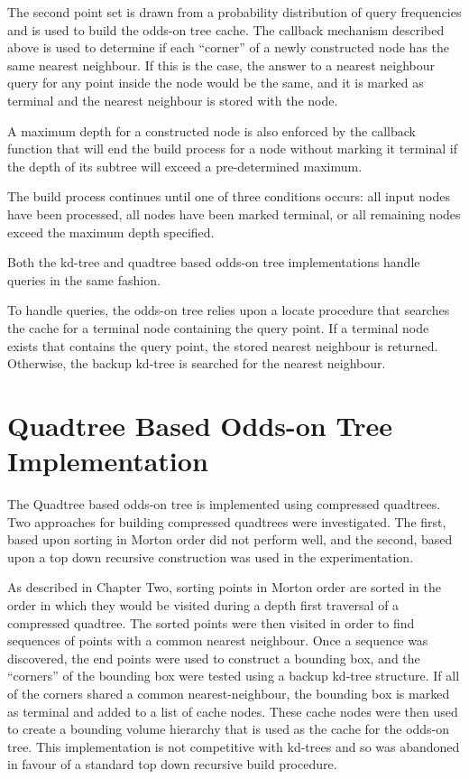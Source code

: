 \documentclass[mcs]{scsthesis}
\begin{document}
The second point set is drawn from a probability distribution of query
frequencies and is used to build the odds-on tree cache. The callback mechanism
described above is used to determine if each ``corner'' of a newly constructed
node has the same nearest neighbour. If this is the case, the answer to a
nearest neighbour query for any point inside the node would be the same, and it
is marked as terminal and the nearest neighbour is stored with the node.

A maximum depth for a constructed node is also enforced by the callback
function that will end the build process for a node without marking it
terminal if the depth of its subtree will exceed a pre-determined maximum.

The build process continues until one of three conditions occurs: all input nodes
have been processed, all nodes have been marked terminal, or all remaining nodes
exceed the maximum depth specified.

Both the kd-tree and quadtree based odds-on tree implementations handle queries
in the same fashion.

To handle queries, the odds-on tree relies upon a locate procedure that searches
the cache for a terminal node containing the query point. If a terminal node
exists that contains the query point, the stored nearest neighbour is returned.
Otherwise, the backup kd-tree is searched for the nearest neighbour.

\section{Quadtree Based Odds-on Tree Implementation}

The Quadtree based odds-on tree is implemented using compressed quadtrees. Two
approaches for building compressed quadtrees were investigated. The first,
based upon sorting in Morton order did not perform well, and the second, based
upon a top down recursive construction was used in the experimentation.

As described in Chapter Two, sorting points in Morton order are sorted in the
order in which they would be visited during a depth first traversal of a
compressed quadtree. The sorted points were then visited in order to find
sequences of points with a common nearest neighbour. Once a sequence was
discovered, the end points were used to construct a bounding box, and the
``corners'' of the bounding box were tested using a backup kd-tree structure.
If all of the corners shared a common nearest-neighbour, the bounding box is
marked as terminal and added to a list of cache nodes. These cache nodes were
then used to create a bounding volume hierarchy that is used as the cache for
the odds-on tree. This implementation is not competitive with kd-trees and so
was abandoned in favour of a standard top down recursive build procedure.
\end{document}
